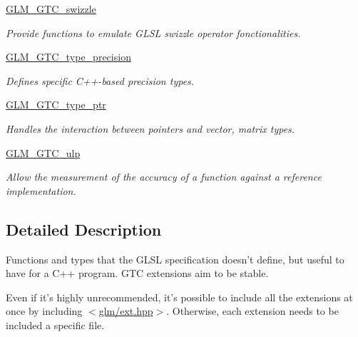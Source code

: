 \begin{DoxyCompactItemize}
\hyperlink{group__gtc__swizzle}{G\-L\-M\-\_\-\-G\-T\-C\-\_\-swizzle}
\begin{DoxyCompactList}\small\item\em Provide functions to emulate G\-L\-S\-L swizzle operator fonctionalities. \end{DoxyCompactList}\item 
\hyperlink{group__gtc__type__precision}{G\-L\-M\-\_\-\-G\-T\-C\-\_\-type\-\_\-precision}
\begin{DoxyCompactList}\small\item\em Defines specific C++-\/based precision types. \end{DoxyCompactList}\item 
\hyperlink{group__gtc__type__ptr}{G\-L\-M\-\_\-\-G\-T\-C\-\_\-type\-\_\-ptr}
\begin{DoxyCompactList}\small\item\em Handles the interaction between pointers and vector, matrix types. \end{DoxyCompactList}\item 
\hyperlink{group__gtc__ulp}{G\-L\-M\-\_\-\-G\-T\-C\-\_\-ulp}
\begin{DoxyCompactList}\small\item\em Allow the measurement of the accuracy of a function against a reference implementation. \end{DoxyCompactList}\end{DoxyCompactItemize}


\subsection{Detailed Description}
Functions and types that the G\-L\-S\-L specification doesn't define, but useful to have for a C++ program. G\-T\-C extensions aim to be stable.

Even if it's highly unrecommended, it's possible to include all the extensions at once by including $<$\hyperlink{ext_8hpp_source}{glm/ext.\-hpp}$>$. Otherwise, each extension needs to be included a specific file. 